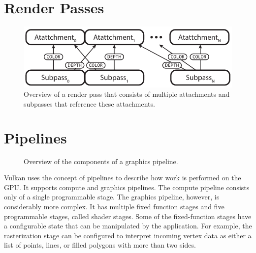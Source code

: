   \section{Render Passes}
  \label{sec:RenderPassesOverview}
    \tbd

    \begin{figure}
      \centering
      \includegraphics[width=\textwidth]{Main/Images/RenderPassOverview}
      \caption{Overview of a render pass that consists of multiple attachments and subpasses that reference these attachments.}
      \label{fig:RenderPassOverview}
    \end{figure}

  \section{Pipelines}
  \label{sec:Pipelines}

    \begin{figure}
      \centering
      \caption{Overview of the components of a graphics pipeline.}
      \label{fig:GraphicsPipeline}
    \end{figure}

    Vulkan uses the concept of pipelines to describe how work is performed on the GPU. It supports compute and graphics pipelines. The compute pipeline consists only of a single programmable stage. The graphics pipeline, however, is considerably more complex. It has multiple fixed function stages and five programmable stages, called shader stages. Some of the fixed-function stages have a configurable state that can be manipulated by the \gls{application}. For example, the rasterization stage can be configured to interpret incoming vertex data as either a list of points, lines, or filled polygons with more than two sides.

